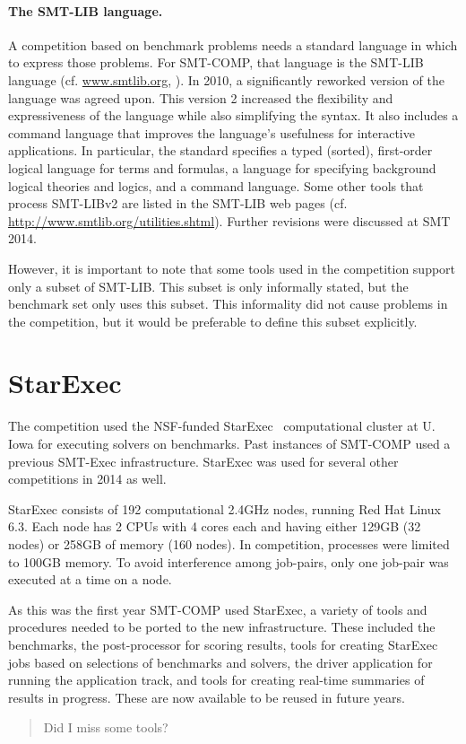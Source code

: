 \documentclass[twoside,11pt]{article}
\newcommand{\comment}[2]{\begin{quote}\sc #1\marginpar{\textcolor{red}{$\ast^{\mbox{#2}}$}}\end{quote}}
\newcommand{\davidc}[1]{\comment{#1}{DC}}
\begin{document}
\paragraph{The SMT-LIB language.} A competition based on benchmark problems needs a standard language in which to express those problems.
For SMT-COMP, that language is the SMT-LIB language (cf. \url{www.smtlib.org}, \cite{BarST-SMT-10} \cite{Cok-SMTLIBTutorial-2011}). 
In 2010, a significantly reworked version of the language was agreed upon.
This version 2 increased the flexibility and expressiveness of the language while also simplifying the syntax. 
It also includes a command language that improves the language's usefulness for interactive applications.
In particular, the standard specifies a typed (sorted), first-order logical language for terms and formulas, a language for specifying background logical theories and logics, and a command language. Some other tools that process SMT-LIBv2 are listed in the SMT-LIB web pages (cf. \url{http://www.smtlib.org/utilities.shtml}). Further revisions were discussed at SMT 2014.

However, it is important to note that some tools used in the competition support only a subset of SMT-LIB. This subset is only informally stated, but the benchmark set only uses this subset. This informality did not cause problems in the competition, but it would be preferable to define this subset explicitly.

\section{StarExec}
\label{sec:starexec}

The competition used the NSF-funded StarExec~\cite{DBLP:conf/cade/StumpST14} computational cluster at U. Iowa for executing solvers on benchmarks. Past instances of SMT-COMP used a previous SMT-Exec infrastructure. StarExec was used for several other competitions in 2014 as well.

StarExec consists of 192 computational 2.4GHz nodes, running Red Hat Linux 6.3. Each node has 2 CPUs with 4 cores each and having either 129GB (32 nodes) or 258GB of memory (160 nodes). In competition, processes were limited to 100GB memory. To avoid interference among job-pairs, only one job-pair was executed at a time on a node. 


As this was the first year SMT-COMP used StarExec, a variety of tools and procedures needed to be ported to the new infrastructure. These included the benchmarks, the post-processor for scoring results, tools for creating StarExec jobs based on selections of benchmarks and solvers, the driver application for running the application track, and tools for creating real-time summaries of results in progress. These are now available to be reused in future years.
\davidc{Did I miss some tools?}
\end{document}
